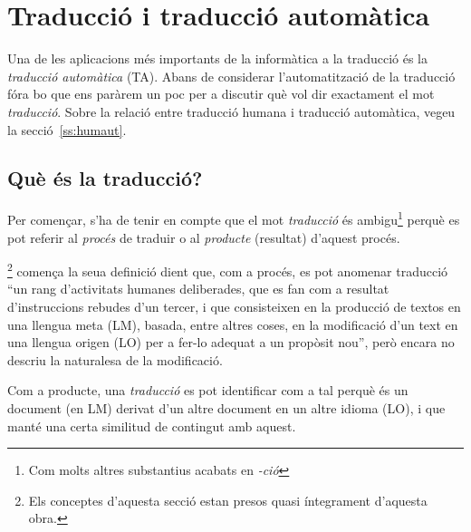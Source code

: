 \chapter{Traducció i traducció automàtica}
\label{se:TiTA}

Una de les aplicacions més importants de la informàtica a la
traducció és la \emph{traducció automàtica} (TA).  Abans de considerar
l'automatització de la traducció fóra bo que ens paràrem un poc per a
discutir què vol dir exactament el mot \emph{traducció}. Sobre la
relació entre traducció humana i traducció automàtica, vegeu la
secció~\ref{ss:humaut}.

\section{Què és la traducció?}
\label{ss:trad}

Per començar, s'ha de tenir en compte que 
el mot \emph{traducció} és ambigu\footnote{Com molts altres
  substantius acabats en \emph{-ció}} perquè es pot
referir al \emph{procés} de traduir o al
\emph{producte} (resultat) d'aquest procés.

\citet{sager93b}\footnote{Els conceptes
d'aquesta secció estan presos quasi íntegrament d'aquesta
obra.} comença la seua definició dient que, com a procés,
es pot anomenar traducció ``un rang d'activitats humanes
deliberades, que es fan com a resultat d'instruccions rebudes d'un tercer,
i que consisteixen en la producció de textos en una llengua meta (LM),
basada, entre altres coses, en la modificació d'un text en una llengua
origen (LO) per a fer-lo adequat a un propòsit nou'', però encara no
descriu la naturalesa de la modificació.

Com a producte, una \emph{traducció} es pot identificar com a tal
perquè és un document (en LM)  derivat d'un altre document en un altre
idioma (LO), i que manté una certa similitud de contingut amb aquest.

